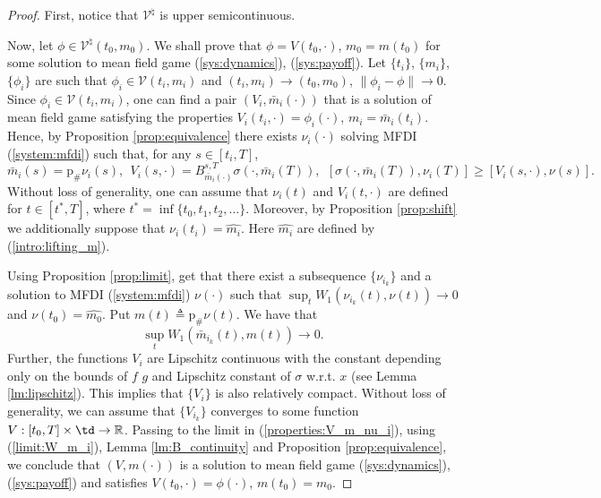 \documentclass[a4paper,12pt]{article}
\begin{document}
\begin{proof} First, notice that $\mathcal{V}^\natural$ is upper semicontinuous.
	
	Now, let $\phi\in\mathcal{V}^\natural(t_0,m_0)$. We shall prove that $\phi=V(t_0,\cdot)$, $m_0=m(t_0)$ for some solution to mean field game  (\ref{sys:dynamics}), (\ref{sys:payoff}). Let $\{t_i\}$, $\{m_i\}$, $\{\phi_i\}$ are such that $\phi_i\in\mathcal{V}(t_i,m_i)$ and $(t_i,m_i)\rightarrow (t_0,m_0)$, $\|\phi_i-\phi\|\rightarrow 0$. Since $\phi_i\in\mathcal{V}(t_i,m_i)$, one can find a pair $(V_i,\bar{m}_i(\cdot))$ that is a solution of mean field game satisfying the properties $V_i(t_i,\cdot)=\phi_i(\cdot)$, $m_i=\bar{m}_i(t_i)$. Hence, by Proposition \ref{prop:equivalence} there exists $\nu_i(\cdot)$ solving MFDI (\ref{system:mfdi}) such that, for any $s\in [t_i,T]$,  
	\begin{equation}\label{properties:V_m_nu_i}
	\bar{m}_i(s)=\mathrm{p}_\#\nu_i(s),\ \ V_i(s,\cdot)=B_{\bar{m}_i(\cdot)}^{s,T}\sigma(\cdot,\bar{m}_i(T)),\ \ [\sigma(\cdot,\bar{m}_i(T)),\nu_i(T)]\geq [V_i(s,\cdot),\nu(s)].
	\end{equation} Without loss of generality, one can assume that $\nu_i(t)$ and $V_i(t,\cdot)$ are defined for $t\in [t^*,T]$, where $t^*=\inf\{t_0,t_1,t_2,\ldots\}$. Moreover, by Proposition \ref{prop:shift} we additionally suppose that $\nu_i(t_i)=\widehat{m_i}$. Here $\widehat{m_i}$ are defined by (\ref{intro:lifting_m}).
	
	Using Proposition \ref{prop:limit}, get that there exist a subsequence $\{\nu_{i_k}\}$ and a solution to MFDI (\ref{system:mfdi}) $\nu(\cdot)$ such that $\sup_tW_1(\nu_{i_k}(t),\nu(t))\rightarrow 0$ and $\nu(t_0)=\widehat{m_0}$. Put $m(t)\triangleq \mathrm{p}_\#\nu(t)$. We have that \begin{equation}\label{limit:W_m_i}
	\sup_tW_1(\bar{m}_{i_k}(t),m(t))\rightarrow 0.
	\end{equation} Further, the functions $V_i$ are Lipschitz continuous with the constant depending only on the bounds of $f$  $g$ and Lipschitz constant of $\sigma$ w.r.t. $x$ (see  Lemma \ref{lm:lipschitz}). This implies that $\{V_i\}$ is also relatively compact. Without loss of generality, we can assume that $\{V_{i_k}\}$ converges to some function $V:[t_0,T]\times\td\rightarrow\mathbb{R}$. Passing to the limit in (\ref{properties:V_m_nu_i}), using (\ref{limit:W_m_i}), Lemma \ref{lm:B_continuity} and Proposition \ref{prop:equivalence}, we conclude that  $(V,m(\cdot))$ is a solution to mean field game (\ref{sys:dynamics}), (\ref{sys:payoff}) and satisfies $V(t_0,\cdot)=\phi(\cdot)$, $m(t_0)=m_0$.
\end{proof}
\end{document}
